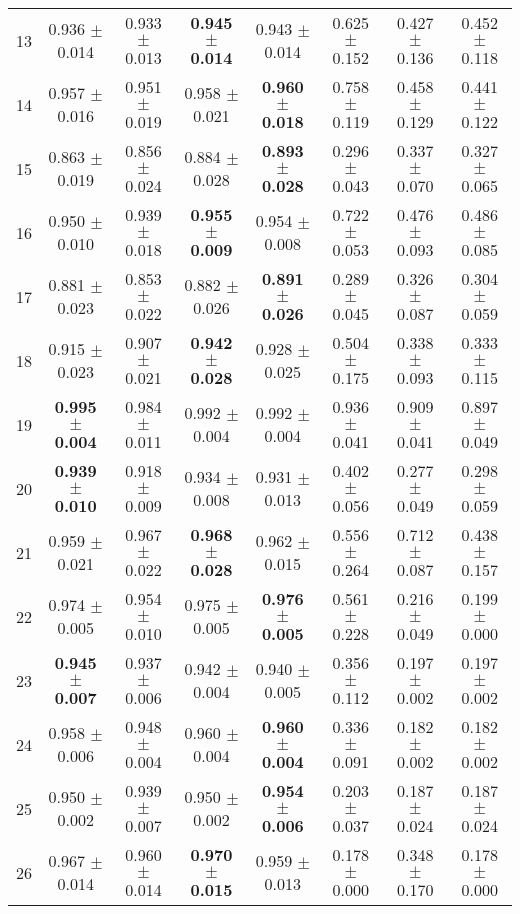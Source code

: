 \begin{table}[!ht]
{\begin{tabular}{r c c c c c c c}
13 & 0.936 $\pm$ 0.014 & 0.933 $\pm$ 0.013 & \textbf{0.945 $\pm$ 0.014} & 0.943 $\pm$ 0.014 & 0.625 $\pm$ 0.152 & 0.427 $\pm$ 0.136 & 0.452 $\pm$ 0.118 \\
14 & 0.957 $\pm$ 0.016 & 0.951 $\pm$ 0.019 & 0.958 $\pm$ 0.021 & \textbf{0.960 $\pm$ 0.018} & 0.758 $\pm$ 0.119 & 0.458 $\pm$ 0.129 & 0.441 $\pm$ 0.122 \\
15 & 0.863 $\pm$ 0.019 & 0.856 $\pm$ 0.024 & 0.884 $\pm$ 0.028 & \textbf{0.893 $\pm$ 0.028} & 0.296 $\pm$ 0.043 & 0.337 $\pm$ 0.070 & 0.327 $\pm$ 0.065 \\
16 & 0.950 $\pm$ 0.010 & 0.939 $\pm$ 0.018 & \textbf{0.955 $\pm$ 0.009} & 0.954 $\pm$ 0.008 & 0.722 $\pm$ 0.053 & 0.476 $\pm$ 0.093 & 0.486 $\pm$ 0.085 \\
17 & 0.881 $\pm$ 0.023 & 0.853 $\pm$ 0.022 & 0.882 $\pm$ 0.026 & \textbf{0.891 $\pm$ 0.026} & 0.289 $\pm$ 0.045 & 0.326 $\pm$ 0.087 & 0.304 $\pm$ 0.059 \\
18 & 0.915 $\pm$ 0.023 & 0.907 $\pm$ 0.021 & \textbf{0.942 $\pm$ 0.028} & 0.928 $\pm$ 0.025 & 0.504 $\pm$ 0.175 & 0.338 $\pm$ 0.093 & 0.333 $\pm$ 0.115 \\
19 & \textbf{0.995 $\pm$ 0.004} & 0.984 $\pm$ 0.011 & 0.992 $\pm$ 0.004 & 0.992 $\pm$ 0.004 & 0.936 $\pm$ 0.041 & 0.909 $\pm$ 0.041 & 0.897 $\pm$ 0.049 \\
20 & \textbf{0.939 $\pm$ 0.010} & 0.918 $\pm$ 0.009 & 0.934 $\pm$ 0.008 & 0.931 $\pm$ 0.013 & 0.402 $\pm$ 0.056 & 0.277 $\pm$ 0.049 & 0.298 $\pm$ 0.059 \\
21 & 0.959 $\pm$ 0.021 & 0.967 $\pm$ 0.022 & \textbf{0.968 $\pm$ 0.028} & 0.962 $\pm$ 0.015 & 0.556 $\pm$ 0.264 & 0.712 $\pm$ 0.087 & 0.438 $\pm$ 0.157 \\
22 & 0.974 $\pm$ 0.005 & 0.954 $\pm$ 0.010 & 0.975 $\pm$ 0.005 & \textbf{0.976 $\pm$ 0.005} & 0.561 $\pm$ 0.228 & 0.216 $\pm$ 0.049 & 0.199 $\pm$ 0.000 \\
23 & \textbf{0.945 $\pm$ 0.007} & 0.937 $\pm$ 0.006 & 0.942 $\pm$ 0.004 & 0.940 $\pm$ 0.005 & 0.356 $\pm$ 0.112 & 0.197 $\pm$ 0.002 & 0.197 $\pm$ 0.002 \\
24 & 0.958 $\pm$ 0.006 & 0.948 $\pm$ 0.004 & 0.960 $\pm$ 0.004 & \textbf{0.960 $\pm$ 0.004} & 0.336 $\pm$ 0.091 & 0.182 $\pm$ 0.002 & 0.182 $\pm$ 0.002 \\
25 & 0.950 $\pm$ 0.002 & 0.939 $\pm$ 0.007 & 0.950 $\pm$ 0.002 & \textbf{0.954 $\pm$ 0.006} & 0.203 $\pm$ 0.037 & 0.187 $\pm$ 0.024 & 0.187 $\pm$ 0.024 \\
26 & 0.967 $\pm$ 0.014 & 0.960 $\pm$ 0.014 & \textbf{0.970 $\pm$ 0.015} & 0.959 $\pm$ 0.013 & 0.178 $\pm$ 0.000 & 0.348 $\pm$ 0.170 & 0.178 $\pm$ 0.000 \\

\end{tabular}}
\end{table}
